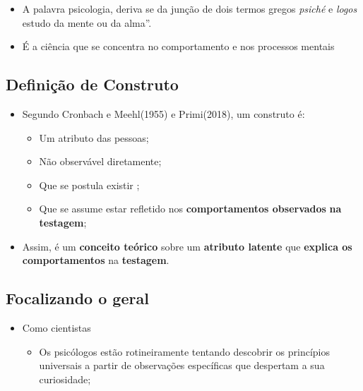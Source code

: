 \documentclass[
]{book}
\providecommand{\tightlist}{%
  \setlength{\itemsep}{0pt}\setlength{\parskip}{0pt}}
\begin{document}
\begin{itemize}
\tightlist
\item
  A palavra psicologia, deriva se da junção de dois termos gregos \emph{psiché} e \emph{logos} estudo da mente ou da alma''.
\item
  É a ciência que se concentra no comportamento e nos processos mentais
\end{itemize}

\hypertarget{definiuxe7uxe3o-de-construto}{%
\subsection{Definição de Construto}\label{definiuxe7uxe3o-de-construto}}

\begin{itemize}
\tightlist
\item
  Segundo Cronbach e Meehl(1955) e Primi(2018), um construto é:

  \begin{itemize}
  \tightlist
  \item
    Um atributo das pessoas;
  \item
    Não observável diretamente;
  \item
    Que se postula existir ;
  \item
    Que se assume estar refletido nos \textbf{comportamentos observados} \textbf{na testagem};
  \end{itemize}
\item
  Assim, é um \textbf{conceito teórico} sobre um \textbf{atributo latente} que \textbf{explica os comportamentos} na \textbf{testagem}.
\end{itemize}

\hypertarget{focalizando-o-geral}{%
\subsection{Focalizando o geral}\label{focalizando-o-geral}}

\begin{itemize}
\tightlist
\item
  Como cientistas

  \begin{itemize}
  \tightlist
  \item
    Os psicólogos estão rotineiramente tentando descobrir os princípios universais a partir de observações específicas que despertam a sua curiosidade;
  \end{itemize}
\end{itemize}
\end{document}
